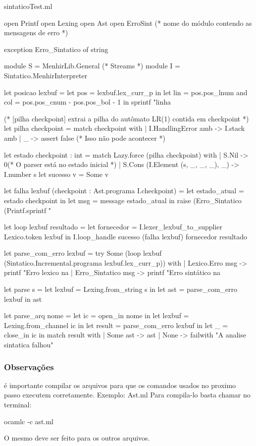 \documentclass[12pt,a4paper,twoside]{article}
\begin{document}
sintaticoTest.ml
\begin{terminal}
open Printf
open Lexing
open Ast
open ErroSint (* nome do módulo contendo as mensagens de erro *)

exception Erro_Sintatico of string

module S = MenhirLib.General (* Streams *)
module I = Sintatico.MenhirInterpreter

let posicao lexbuf =
		let pos = lexbuf.lex_curr_p in
		let lin = pos.pos_lnum
		and col = pos.pos_cnum - pos.pos_bol - 1 in
		sprintf "linha %

(* [pilha checkpoint] extrai a pilha do autômato LR(1) contida em checkpoint *)
let pilha checkpoint = 	 match checkpoint with
						| I.HandlingError amb -> I.stack amb
						| _ -> assert false (* Isso não pode acontecer *)


let estado checkpoint : int = match Lazy.force (pilha checkpoint) with
						| S.Nil -> 0(* O parser está no estado inicial *)
						| S.Cons (I.Element (s, _, _, _), _) -> I.number s
let sucesso v = Some v

let falha lexbuf (checkpoint : Ast.programa I.checkpoint) =
						let estado_atual = estado checkpoint in
						let msg = message estado_atual in
						raise (Erro_Sintatico (Printf.sprintf "%

let loop lexbuf resultado =
						let fornecedor = I.lexer_lexbuf_to_supplier Lexico.token lexbuf in
						I.loop_handle sucesso (falha lexbuf) fornecedor resultado

let parse_com_erro lexbuf =
				try
					Some (loop lexbuf (Sintatico.Incremental.programa lexbuf.lex_curr_p))
				with
					| Lexico.Erro msg -> printf "Erro lexico na %
					| Erro_Sintatico msg -> printf "Erro sintático na %

let parse s =
				let lexbuf = Lexing.from_string s in
				let ast = parse_com_erro lexbuf in ast

let parse_arq nome =	let ic = open_in nome in
						let lexbuf = Lexing.from_channel ic in
						let result = parse_com_erro lexbuf in
						let _ = close_in ic in
						match result with
									| Some ast -> ast
									| None -> failwith "A analise sintatica falhou"
\end{terminal}

\subsubsection{Observações}
é importante compilar os arquivos para que os comandos usados no proximo passo executem corretamente.
\newline
Exemplo: Ast.ml \newline
Para compila-lo basta chamar no terminal:
\begin{terminal}
ocamlc -c ast.ml
\end{terminal}
O mesmo deve ser  feito para os outros arquivos.
\end{document}
